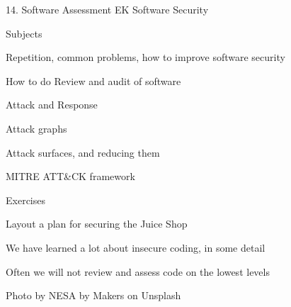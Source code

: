 \documentclass[Screen16to9,17pt]{foils}
\begin{document}
\mytitlepage
{14. Software Assessment}
{EK  Software Security}


\begin{list1}
\item Subjects
\begin{list2}
\item Repetition, common problems, how to improve software security
\item How to do Review and audit of software
\item Attack and Response
\item Attack graphs
\item Attack surfaces, and reducing them
\item MITRE ATT\&CK framework
\end{list2}
\item Exercises
\begin{list2}
\item Layout a plan for securing the Juice Shop
\end{list2}
\end{list1}






\begin{list1}
\item We have learned a lot about insecure coding, in some detail
\item Often we will not review and assess code on the lowest levels
\end{list1}

\hfill {\small Photo by NESA by Makers on Unsplash}
\end{document}
